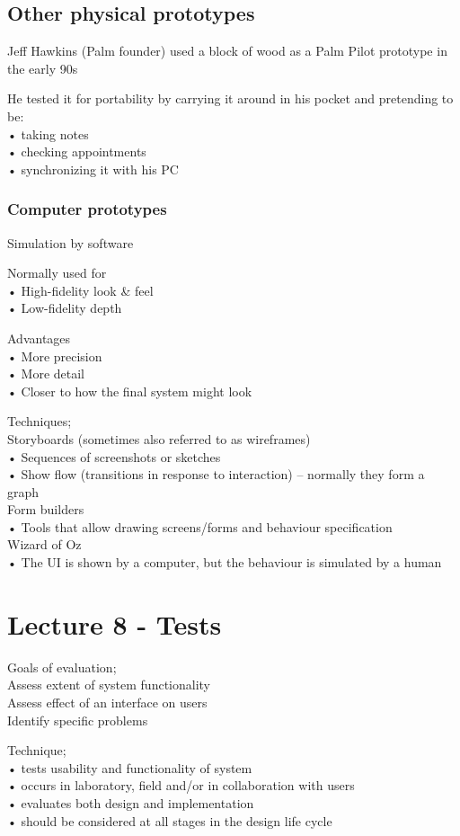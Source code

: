 \documentclass[]{project_plan}
\begin{document}
\section{Other physical prototypes}
Jeff Hawkins (Palm founder) used a block of wood as a Palm Pilot prototype in the early 90s

He tested it for portability by carrying it around in his pocket and pretending to be:\\
• taking notes\\
• checking appointments\\
• synchronizing it with his PC

\subsection{Computer prototypes}
Simulation by software

Normally used for\\
• High-fidelity look \& feel\\
• Low-fidelity depth

Advantages\\
• More precision\\
• More detail\\
• Closer to how the final system might look

Techniques;\\
Storyboards (sometimes also referred to as wireframes)\\
• Sequences of screenshots or sketches\\
• Show flow (transitions in response to interaction) – normally they form a graph\\
Form builders\\
• Tools that allow drawing screens/forms and behaviour specification\\
Wizard of Oz\\
• The UI is shown by a computer, but the behaviour is simulated by a human

\chapter{Lecture 8 - Tests}

Goals of evaluation;\\
Assess extent of system functionality\\
Assess effect of an interface on users\\
Identify specific problems

Technique;\\
• tests usability and functionality of system\\
• occurs in laboratory, field and/or in collaboration with users\\
• evaluates both design and implementation\\
• should be considered at all stages in the design life cycle
\end{document}
